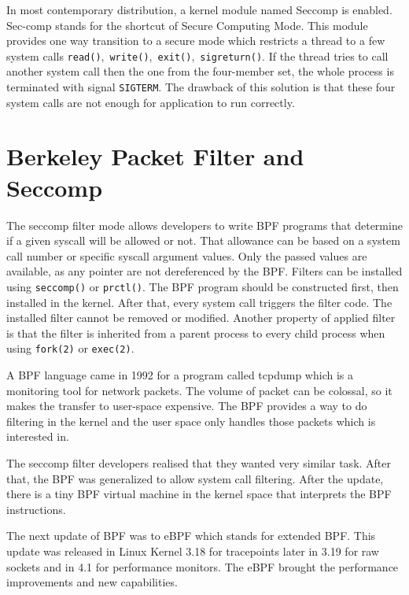 In most contemporary distribution, a kernel module named Seccomp \cite{seccomp_sandbox} is enabled.
Sec-comp stands for the shortcut of Secure Computing Mode.
This module provides one way transition to a secure mode which restricts a thread to a few system calls \texttt{read()},\ \texttt{write()},\ \texttt{exit()},\ \texttt{sigreturn()}.
If the thread tries to call another system call then the one from the four-member set, the whole process is terminated with signal \texttt{SIGTERM}.
The drawback of this solution is that these four system calls are not enough for application to run correctly.


\section{Berkeley Packet Filter and Seccomp}
The seccomp filter mode allows developers to write BPF programs that determine if a given syscall will be allowed or not.
That allowance can be based on a system call number or specific syscall argument values.
Only the passed values are available, as any pointer are not dereferenced by the BPF.
Filters can be installed using \texttt{seccomp()} or \texttt{prctl()}.
The BPF program should be constructed first, then installed in the kernel.
After that, every system call triggers the filter code.
The installed filter cannot be removed or modified.
Another property of applied filter is that the filter is inherited from a parent process to every child process when using \texttt{fork(2)} or \texttt{exec(2)}.

A BPF language came in 1992 for a program called tcpdump which is a monitoring tool for network packets.
The volume of packet can be colossal, so it makes the transfer to user-space expensive.
The BPF provides a way to do filtering in the kernel and the user space only handles those packets which is interested in.

The seccomp filter developers realised that they wanted very similar task.
After that, the BPF was generalized to allow system call filtering.
After the update, there is a tiny BPF virtual machine in the kernel space that interprets the BPF instructions.

The next update of BPF was to eBPF which stands for extended BPF.
This update was released in Linux Kernel 3.18 for tracepoints later in 3.19 for raw sockets and in 4.1 for performance monitors.
The eBPF brought the performance improvements and new capabilities.

